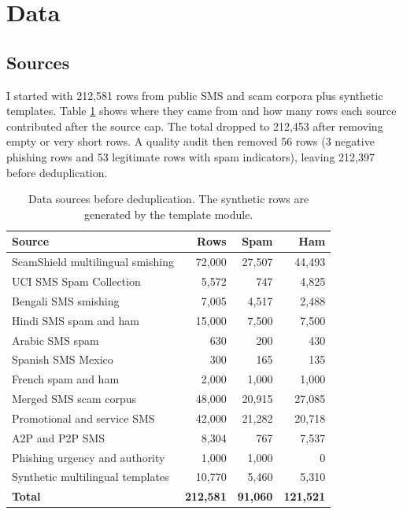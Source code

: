 \documentclass[11pt]{article}
\begin{document}
\section{Data}

\subsection{Sources}

I started with 212,581 rows from public SMS and scam corpora plus synthetic templates. Table \ref{tab:sources} shows where they came from and how many rows each source contributed after the source cap. The total dropped to 212,453 after removing empty or very short rows. A quality audit then removed 56 rows (3 negative phishing rows and 53 legitimate rows with spam indicators), leaving 212,397 before deduplication.

\begin{table}[htbp]
\centering
\small
\caption{Data sources before deduplication. The synthetic rows are generated by the template module.}
\label{tab:sources}
\begin{tabularx}{\textwidth}{Xrrr}
\toprule
Source & Rows & Spam & Ham \\
\midrule
ScamShield multilingual smishing & 72,000 & 27,507 & 44,493 \\
UCI SMS Spam Collection & 5,572 & 747 & 4,825 \\
Bengali SMS smishing & 7,005 & 4,517 & 2,488 \\
Hindi SMS spam and ham & 15,000 & 7,500 & 7,500 \\
Arabic SMS spam & 630 & 200 & 430 \\
Spanish SMS Mexico & 300 & 165 & 135 \\
French spam and ham & 2,000 & 1,000 & 1,000 \\
Merged SMS scam corpus & 48,000 & 20,915 & 27,085 \\
Promotional and service SMS & 42,000 & 21,282 & 20,718 \\
A2P and P2P SMS & 8,304 & 767 & 7,537 \\
Phishing urgency and authority & 1,000 & 1,000 & 0 \\
Synthetic multilingual templates & 10,770 & 5,460 & 5,310 \\
\midrule
\textbf{Total} & \textbf{212,581} & \textbf{91,060} & \textbf{121,521} \\
\bottomrule
\end{tabularx}
\end{table}
\end{document}
